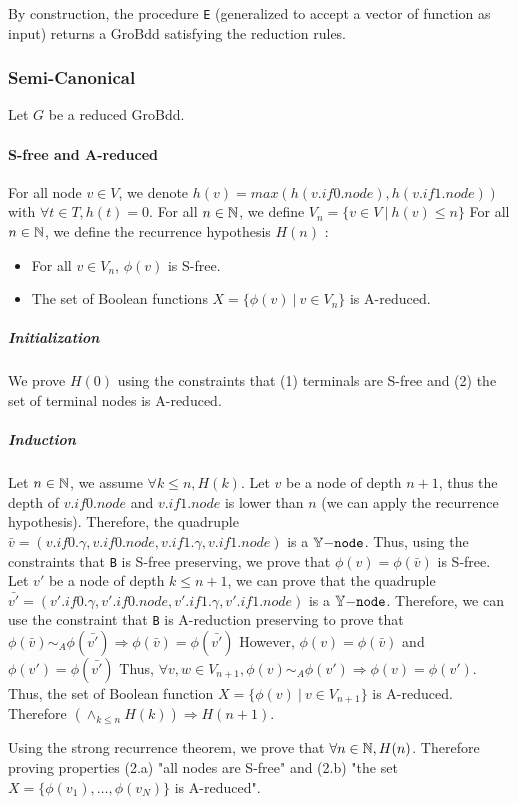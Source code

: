 \documentclass[a4paper,10pt]{article}
\begin{document}
By construction, the procedure \texttt{E} (generalized to accept a vector of function as input) returns a GroBdd satisfying the reduction rules.

\subsubsection{Semi-Canonical}

Let $G$ be a reduced GroBdd.

\paragraph{S-free and A-reduced}
For all node $v\in V$, we denote $h(v) = max(h(v.if0.node), h(v.if1.node))$ with $\forall t\in T, h(t) = 0$.
For all $n\in\mathbb{N}$, we define $V_n = \{v\in V ~|~ h(v) \leq n\}$
For all $n\in\mathbb{N}$, we define the recurrence hypothesis $H(n)$ :\begin{itemize}
\item For all $v\in V_n$, $\phi(v)$ is S-free.
\item The set of Boolean functions $X = \{\phi(v) ~|~ v\in V_n\}$ is A-reduced.
\end{itemize}

\subparagraph{Initialization}
We prove $H(0)$ using the constraints that (1) terminals are S-free and (2) the set of terminal nodes is A-reduced.

\subparagraph{Induction}
Let $n\in\mathbb{N}$, we assume $\forall k\leq n, H(k)$.
Let $v$ be a node of depth $n+1$, thus the depth of $v.if0.node$ and $v.if1.node$ is lower than $n$ (we can apply the recurrence hypothesis).
Therefore, the quadruple $\bar{v} = (v.if0.\gamma, v.if0.node, v.if1.\gamma, v.if1.node)$ is a $\mathbb{Y}\mathtt{-node}$.
Thus, using the constraints that \texttt{B} is S-free preserving, we prove that $\phi(v) = \phi(\bar{v})$ is S-free.
Let $v'$ be a node of depth $k\leq n+1$, we can prove that the quadruple $\bar{v'} = (v'.if0.\gamma, v'.if0.node, v'.if1.\gamma, v'.if1.node)$ is a $\mathbb{Y}\mathtt{-node}$.
Therefore, we can use the constraint that \texttt{B} is A-reduction preserving to prove that $\phi(\bar{v}) \sim_A \phi(\bar{v'}) \Rightarrow \phi(\bar{v}) = \phi(\bar{v'})$
However, $\phi(v) = \phi(\bar{v})$ and $\phi(v') = \phi(\bar{v'})$
Thus, $\forall v, w \in V_{n+1}, \phi(v) \sim_A \phi(v') \Rightarrow \phi(v) = \phi(v')$.
Thus, the set of Boolean function $X = \{\phi(v) ~|~ v\in V_{n+1}\}$ is A-reduced.
Therefore $\left(\land_{k\leq n} H(k)\right) \Rightarrow H(n+1)$.

Using the strong recurrence theorem, we prove that $\forall n\in\mathbb{N}, H(n)$.
Therefore proving properties (2.a) "all nodes are S-free" and (2.b) "the set $X = \{\phi(v_1), \dots, \phi(v_N)\}$ is A-reduced".
\end{document}
